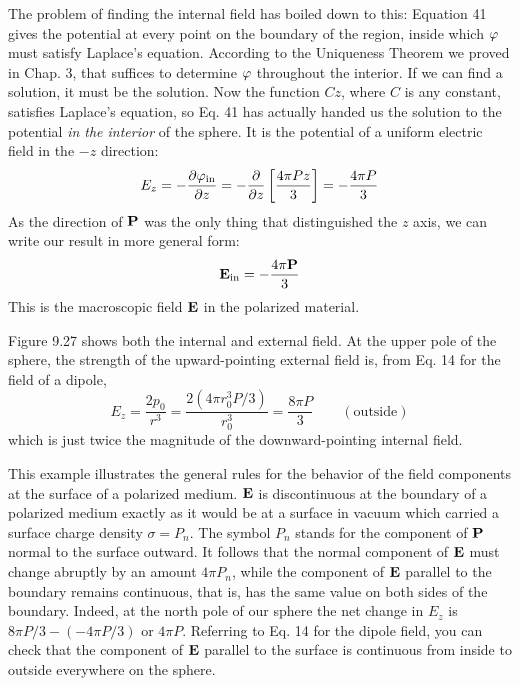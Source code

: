 The problem of finding the internal field has boiled down to this:
Equation 41 gives the potential at every point on the boundary of
the region, inside which $\varphi$ must satisfy Laplace's equation. 
According to the Uniqueness Theorem we proved in Chap. 3, that suffices
to determine $\varphi$ throughout the interior. If we can find a solution,
it must be the solution. Now the function $Cz$, where $C$ is any 
constant, satisfies Laplace's equation, so Eq. 41 has actually handed us
the solution to the potential \emph{in the interior} of the sphere. It is the
potential of a uniform electric field in the  $-z$ direction:
\begin{equation}
  E_z = -\frac{\partial\varphi_\text{in}}{\partial z}
      = -\frac{\partial}{\partial z}\left[\frac{4\pi Pz}{3}\right]
      = -\frac{4\pi P}{3}
\end{equation}
As the direction of $\mathbf{P}$ was the only thing that distinguished the $z$ axis,
we can write our result in more general form:
\begin{equation}
  \mathbf{E}_\text{in} = -\frac{4\pi \mathbf{P}}{3}
\end{equation}
This is the macroscopic field $\mathbf{E}$ in the polarized material.

Figure 9.27 shows both the internal and external field. At the
upper pole of the sphere, the strength of the upward-pointing external
field is, from Eq. 14 for the field of a dipole,
\begin{equation}
  E_z = \frac{2p_0}{r^3} = \frac{2(4\pi r_0^3 P/3)}{r_0^3} = \frac{8\pi P}{3} \qquad (\text{outside})
\end{equation}
which is just twice the magnitude of the downward-pointing internal
field.

This example illustrates the general rules for the behavior of the
field components at the surface of a polarized medium. $\mathbf{E}$ is discontinuous
at the boundary of a polarized medium exactly as it
would be at a surface in vacuum which carried a surface charge
density $\sigma=P_n$. The symbol $P_n$ stands for the component of $\mathbf{P}$
normal to the surface outward. It follows that the normal component
of $\mathbf{E}$ must change abruptly by an amount $4\pi P_n$, while the
component of $\mathbf{E}$ parallel to the boundary remains continuous, that
is, has the same value on both sides of the boundary. Indeed, at the
north pole of our sphere the net change in $E_z$ is $8\pi P/3-(-4\pi P/3)$
or $4\pi P$. Referring to Eq. 14 for the dipole field, you can check that
the component of $\mathbf{E}$ parallel to the surface is continuous from inside
to outside everywhere on the sphere.

